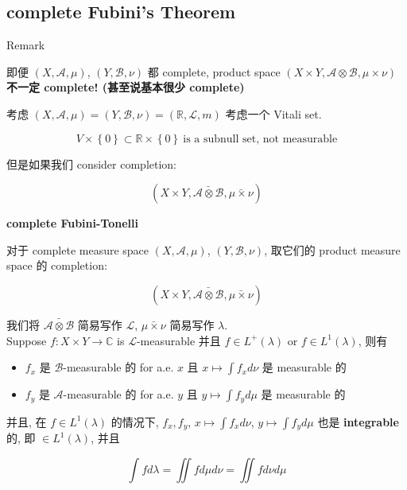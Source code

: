 \documentclass{qlnotes-export}
\begin{document}
\subsection{complete Fubini's Theorem}\label{complete-fubinis-theorem}

\begin{qlremark}{Remark}

即便 \((X,\mathcal{A},\mu)\), \((Y,\mathcal{B},\nu)\) 都 complete, product space \((X \times Y,\mathcal{A} \otimes \mathcal{B},\mu \times \nu)\) \textbf{不一定 complete! (甚至说基本很少 complete)}

\end{qlremark}

\begin{example}

考虑 \((X,\mathcal{A},\mu) = (Y,\mathcal{B},\nu) = ({\mathbb{R}},\mathcal{L},m)\) 考虑一个 Vitali set.

\[V \times \left\{ 0 \right\} \subset {\mathbb{R}} \times \left\{ 0 \right\}\ \text{is a subnull set, not measurable}\]

\end{example}

但是如果我们 consider completion:

\[(X \times Y,\bar{\mathcal{A}\otimes\mathcal{B}},\bar{\mu\times\nu})\]

\begin{theorem}{\protect{}\label{kn-complete-fubini-tonelli}{\textbf{complete
Fubini-Tonelli}}}

对于 complete measure space \((X,\mathcal{A},\mu)\), \((Y,\mathcal{B},\nu)\), 取它们的 product measure space 的 completion:

\[(X \times Y,\bar{\mathcal{A}\otimes\mathcal{B}},\bar{\mu\times\nu})\]

我们将 \(\bar{\mathcal{A}\otimes\mathcal{B}}\) 简易写作 \(\mathcal{L}\), \(\bar{\mu\times\nu}\) 简易写作 \(\lambda\).\\
Suppose \(f:X \times Y\rightarrow{\mathbb{C}}\) is \(\mathcal{L}\)-measurable 并且 \(f \in L^{+}(\lambda)\) or \(f \in L^{1}(\lambda)\), 则有

\begin{itemize}
\item
  \(f_{x}\) 是 \(\mathcal{B}\)-measurable 的 for a.e. \(x\) 且 \(x\mapsto\int f_{x} d\nu\) 是 measurable 的
\item
  \(f_{y}\) 是 \(\mathcal{A}\)-measurable 的 for a.e. \(y\) 且 \(y\mapsto\int f_{y} d\mu\) 是 measurable 的
\end{itemize}

并且, 在 \(f \in L^{1}(\lambda)\) 的情况下, \(f_{x},f_{y}\), \(x\mapsto\int f_{x} d\nu\), \(y\mapsto\int f_{y} d\mu\) 也是 \textbf{integrable} 的, 即 \(\in L^{1}(\lambda)\), 并且

\[\int f d\lambda = \iint f d\mu d\nu = \iint f d\nu d\mu\]

\end{theorem}
\end{document}
